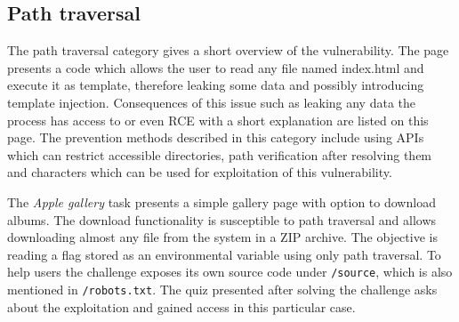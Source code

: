\subsection{Path traversal}

The path traversal category gives a short overview of the vulnerability. The page presents a code which allows the user to read any file named index.html and execute it as template, therefore leaking some data and possibly introducing template injection. Consequences of this issue such as leaking any data the process has access to or even RCE with a short explanation are listed on this page. The prevention methods described in this category include using APIs which can restrict accessible directories, path verification after resolving them and characters which can be used for exploitation of this vulnerability.

The \textit{Apple gallery} task presents a simple gallery page with option to download albums. The download functionality is susceptible to path traversal and allows downloading almost any file from the system in a ZIP archive. The objective is reading a flag stored as an environmental variable using only path traversal. To help users the challenge exposes its own source code under \texttt{/source}, which is also mentioned in \texttt{/robots.txt}. The quiz presented after solving the challenge asks about the exploitation and gained access in this particular case.

